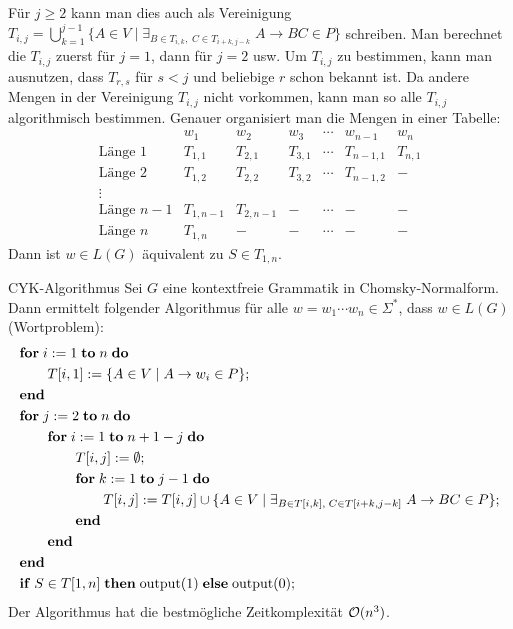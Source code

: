 \begin{Bem}
    Für $j \ge 2$ kann man dies auch als Vereinigung\\
    $T_{i,j} = \bigcup_{k=1}^{j-1} \{A \in V \;|\;
    \exists_{B \in T_{i,k},\; C \in T_{i+k,j-k}}\; A \rightarrow BC \in P\}$
    schreiben.
    Man berechnet die $T_{i,j}$ zuerst für $j = 1$, dann für $j = 2$ usw.
    Um $T_{i,j}$ zu bestimmen, kann man ausnutzen, dass $T_{r,s}$ für
    $s < j$ und beliebige $r$ schon bekannt ist.
    Da andere Mengen in der Vereinigung $T_{i,j}$ nicht vorkommen, kann man
    so alle $T_{i,j}$ algorithmisch bestimmen.
    Genauer organisiert man die Mengen in einer Tabelle:
    \[\begin{array}{r|c|c|ccc|c}
        & w_1 & w_2 & w_3 & \cdots & w_{n-1} & w_n \\\hline
        \text{Länge } 1 & T_{1,1} & T_{2,1} & T_{3,1} & \cdots &
        T_{n-1,1} & T_{n,1} \\\hline
        \text{Länge } 2 & T_{1,2} & T_{2,2} & T_{3,2} & \cdots &
        T_{n-1,2} & - \\\hline
        \vdots \\\hline
        \text{Länge } n - 1 & T_{1,n-1} & T_{2,n-1} & - & \cdots & - &
        - \\\hline
        \text{Länge } n & T_{1,n} & - & - & \cdots & - & -
    \end{array}\]
    Dann ist $w \in L(G)$ äquivalent zu $S \in T_{1,n}$.
\end{Bem}

\linie
\pagebreak

\begin{Satz}{CYK-Algorithmus}
    Sei $G$ eine kontextfreie Grammatik in Chomsky-Normalform.
    Dann ermittelt folgender Algorithmus für alle
    $w = w_1 \dotsb w_n \in \Sigma^\ast$, dass $w \in L(G)$
    (Wortproblem):
    \begin{align*}&
        \mathbf{for}\; i := 1 \;\mathbf{to}\; n \;\mathbf{do}\;\\&
        \qquad T[i, 1] := \{A \in V \;|\; A \rightarrow w_i \in P\};\\&
        \mathbf{end}\;\\&
        \mathbf{for}\; j := 2 \;\mathbf{to}\; n \;\mathbf{do}\;\\&
        \qquad\mathbf{for}\; i := 1 \;\mathbf{to}\; n + 1 - j \;\mathbf{do}\;\\&
        \qquad\qquad T[i, j] := \emptyset;\\&
        \qquad\qquad\mathbf{for}\; k := 1 \;\mathbf{to}\; j - 1 \;\mathbf{do}\;\\&
        \qquad\qquad\qquad T[i, j] := T[i, j] \cup \{A \in V \;|\;
            \exists_{B \in T[i, k],\; C \in T[i + k, j - k]}\;
            A \rightarrow BC \in P\};\\&
        \qquad\qquad\mathbf{end}\;\\&
        \qquad\mathbf{end}\;\\&
        \mathbf{end}\;\\&
        \mathbf{if}\; S \in T[1, n] \;\mathbf{then}\;
        \text{output}(1) \;\mathbf{else}\;
        \text{output}(0);
    \end{align*}
    Der Algorithmus hat die bestmögliche Zeitkomplexität $\mathcal{O}(n^3)$.
\end{Satz}

